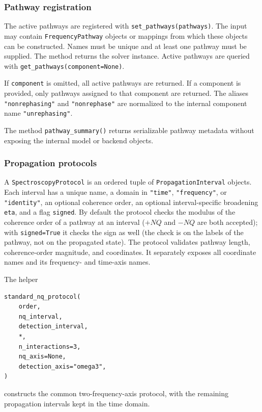 \documentclass[11pt]{article}
\begin{document}
\subsubsection{Pathway registration}

The active pathways are registered with \texttt{set\_pathways(pathways)}. The input may contain \texttt{FrequencyPathway} objects or mappings from which these objects can be constructed. Names must be unique and at least one pathway must be supplied. The method returns the solver instance. Active pathways are queried with \texttt{get\_pathways(component=None)}.
\newline

If \texttt{component} is omitted, all active pathways are returned. If a component is provided, only pathways assigned to that component are returned. The aliases \texttt{"nonrephasing"} and \texttt{"nonrephase"} are normalized to the internal component name \texttt{"unrephasing"}. 
\newline

The method \texttt{pathway\_summary()} returns serializable pathway metadata without exposing the internal model or backend objects.

\subsubsection{Propagation protocols}

A \texttt{SpectroscopyProtocol} is an ordered tuple of \texttt{PropagationInterval} objects. Each interval has a unique name, a domain in \texttt{"time"}, \texttt{"frequency"}, or \texttt{"identity"}, an optional coherence order, an optional interval-specific broadening \texttt{eta}, and a flag \texttt{signed}. By default the protocol checks the modulus of the coherence order of a pathway at an interval ($+NQ$ and $-NQ$ are both accepted); with \texttt{signed=True} it checks the sign as well (the check is on the labels of the pathway, not on the propagated state). The protocol validates pathway length, coherence-order magnitude, and coordinates. It separately exposes all coordinate names and its frequency- and time-axis names.

The helper
\begin{verbatim}
standard_nq_protocol(
    order,
    nq_interval,
    detection_interval,
    *,
    n_interactions=3,
    nq_axis=None,
    detection_axis="omega3",
)
\end{verbatim}
constructs the common two-frequency-axis protocol, with the remaining propagation intervals kept in the time domain.
\end{document}
